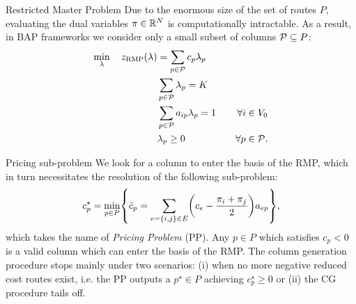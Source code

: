 \begin{frame}{Restricted Master Problem}
	Due to the enormous size of the set of routes $P$, evaluating the dual variables $\pi \in \mathbb R^{N}$ is computationally intractable.
	As a result, in BAP frameworks we consider only a small subset of columns $\mathcal{P} \subseteq P$:
	\begin{align}
		\min_{\lambda} \quad z_{\mathrm{RMP}}(\lambda) & = \sum_{p \in \mathcal{P}}  c_p \lambda_p      & \label{eq:rmp-obj-func}                                                                                                    \\
		                                         & \sum_{p \in \mathcal{P}} \lambda_{p} = K       & \label{eq:rmp-K-routes}                                                                                                    \\
		                                         & \sum_{p \in \mathcal{P}}  a_{ip} \lambda_p = 1 & \quad \forall i \in V_0                                              \label{eq:rmp-customers-visited-by-exactly-one-route} \\
		                                         & \lambda_p \ge 0                         & \quad \forall p \in \mathcal{P} \label{eq:rmp-lambda-mip-var-bounds}.
	\end{align}
\end{frame}

\begin{frame}{Pricing sub-problem}
	We look for a column to enter the basis of the RMP,
	which in turn necessitates the resolution of the following sub-problem:
	\begin{equation}\label{eq:pp-problem}
		{c^\star_p} = \min_{p \in P} \Set*{ \bar{c}_p = \sum_{e = \Set*{i, j} \in E} \Expr*{c_{e} - \frac{\pi_i + \pi_j}{2}} a_{ep}  },
	\end{equation}
	which takes the name of \textit{Pricing Problem} (PP).
	Any $p \in P$ which satisfies $c_p < 0$ is a valid column which can enter the basis of the RMP.
	The column generation procedure stops mainly under two scenarios:
	(i) when no more negative reduced cost routes exist,
	i.e. the PP outputs a $p^\star \in P$ achieving $c^\star_p \ge 0$
	or
	(ii) the CG procedure tails off.

\end{frame}

